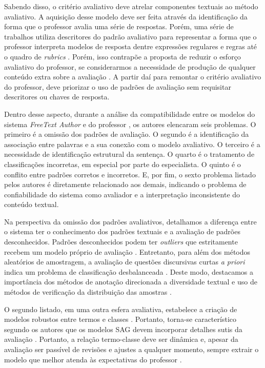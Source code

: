 Sabendo disso, o critério avaliativo deve atrelar componentes textuais ao método avaliativo. A aquisição desse modelo deve ser feita através da identificação da forma que o professor avalia uma série de respostas. Porém, uma série de trabalhos utiliza descritores do padrão avaliativo para representar a forma que o professor interpreta modelos de resposta dentre expressões regulares e regras até o quadro de \textit{rubrics} \cite{butcher2010, mohler2011, ramachandran2015a}. Porém, isso contrapõe a proposta de reduzir o esforço avaliativo do professor, se considerarmos a necessidade de produção de qualquer conteúdo extra sobre a avaliação \cite{zesch2015, horbach2018}. A partir daí para remontar o critério avaliativo do professor, deve priorizar o uso de padrões de avaliação sem requisitar descritores ou chaves de resposta.

Dentro desse aspecto, durante a análise da compatibilidade entre os modelos do sistema \textit{FreeText Author} e do professor \cite{butcher2010}, os autores elencaram seis problemas. O primeiro é a omissão dos padrões de avaliação. O segundo é a identificação da associação entre palavras e a sua conexão com o modelo avaliativo. O terceiro é a necessidade de identificação estrutural da sentença. O quarto é o tratamento de classificações incorretas, em especial por parte do especialista. O quinto é o conflito entre padrões corretos e incorretos. E, por fim, o sexto problema listado pelos autores é diretamente relacionado aos demais, indicando o problema de confiabilidade do sistema como avaliador e a interpretação inconsistente do conteúdo textual.

Na perspectiva da omissão dos padrões avaliativos, detalhamos a diferença entre o sistema ter o conhecimento dos padrões textuais e a avaliação de padrões desconhecidos. Padrões desconhecidos podem ter \textit{outliers} que estritamente recebem um modelo próprio de avaliação \cite{filighera2020}. Entretanto, para além dos métodos aleatórios de amostragem, a avaliação de questões discursivas curtas \textit{a priori} indica um problema de classificação desbalanceada \cite{dzikovska2012}. Deste modo, destacamos a importância dos métodos de anotação direcionada a diversidade textual e uso de métodos de verificação da distribuição das amostras \cite{marvaniya2018}.

O segundo listado, em uma outra esfera avaliativa, estabelece a criação de modelos robustos entre termos e classes \cite{ramachandran2015a}. Portanto, torna-se característico segundo os autores que os modelos SAG devem incorporar detalhes sutis da avaliação \cite{horbach2018}. Portanto, a relação termo-classe deve ser dinâmica e, apesar da avaliação ser passível de revisões e ajustes a qualquer momento, sempre extrair o modelo que melhor atenda às expectativas do professor \cite{spalenza2016a}.

